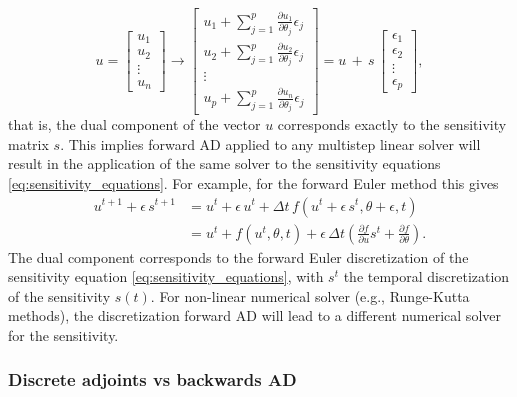 \begin{equation}
    u =
    \begin{bmatrix}
    u_1 \\
    u_2 \\
    \vdots \\
    u_n
    \end{bmatrix}
    \rightarrow
    \begin{bmatrix}
    u_1 + \sum_{j=1}^p \frac{\partial u_1}{\partial \theta_j} \epsilon_j \\
    u_2 + \sum_{j=1}^p \frac{\partial u_2}{\partial \theta_j} \epsilon_j \\
    \vdots \\
    u_p + \sum_{j=1}^p \frac{\partial u_n}{\partial \theta_j} \epsilon_j
    \end{bmatrix}
    = 
    u \, + \, s \, 
    \begin{bmatrix}
    \epsilon_1 \\
    \epsilon_2 \\
    \vdots \\
    \epsilon_p
    \end{bmatrix},
\end{equation}
that is, the dual component of the vector $u$ corresponds exactly to the sensitivity matrix $s$. 
This implies forward AD applied to any multistep linear solver will result in the application of the same solver to the sensitivity equations \eqref{eq:sensitivity_equations}.  
For example, for the forward Euler method this gives 
\begin{align}
    u^{t+1} + \epsilon \, s^{t+1}
    &= 
    u^t + \epsilon \, u^t + \Delta t \, f (u^t + \epsilon \, s^t, \theta + \epsilon, t) \nonumber \\
    &= 
    u^t + f(u^t, \theta, t) 
    + 
    \epsilon \, \Delta t 
    \left( 
    \frac{\partial f}{\partial u} s^t + 
    \frac{\partial f}{\partial \theta}
    \right).
    \label{eq:sensitivity-equation-AD}
\end{align}
The dual component corresponds to the forward Euler discretization of the sensitivity equation \eqref{eq:sensitivity_equations}, with $s^t$ the temporal discretization of the sensitivity $s(t)$.
For non-linear numerical solver (e.g., Runge-Kutta methods), the discretization forward AD will lead to a different numerical solver for the sensitivity.  

\subsubsection{Discrete adjoints vs backwards AD}
\label{section:comparison-discrete-adjoint-AD}

